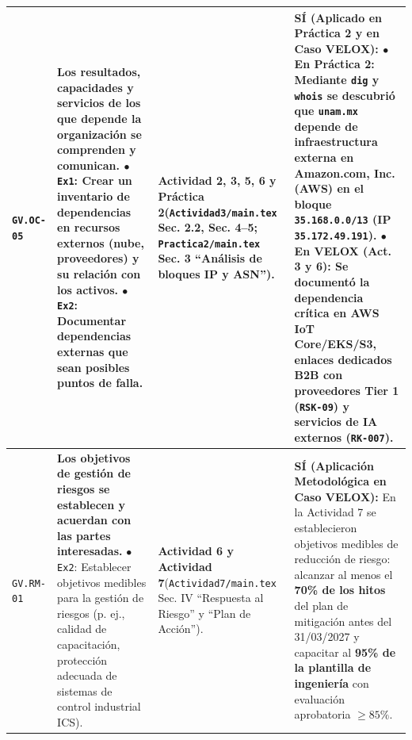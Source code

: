 \documentclass[letterpaper,11pt]{article}
\begin{document}
\begin{longtable}{|C{1.5cm}|L{5.3cm}|L{4.3cm}|L{5.8cm}|}
\texttt{GV.OC-05} &
\textbf{Los resultados, capacidades y servicios de los que depende la organización se comprenden y comunican.}\newline
$\bullet$ \texttt{Ex1}: Crear un inventario de dependencias en recursos externos (nube, proveedores) y su relación con los activos.\newline
$\bullet$ \texttt{Ex2}: Documentar dependencias externas que sean posibles puntos de falla. &
\textbf{Actividad 2, 3, 5, 6 y Práctica 2}\newline (\texttt{Actividad3/main.tex} Sec. 2.2, Sec. 4--5; \texttt{Practica2/main.tex} Sec. 3 ``Análisis de bloques IP y ASN''). &
\textbf{SÍ (Aplicado en Práctica 2 y en Caso VELOX):}\newline
$\bullet$ \textbf{En Práctica 2:} Mediante \texttt{dig} y \texttt{whois} se descubrió que \texttt{unam.mx} depende de infraestructura externa en \textbf{Amazon.com, Inc. (AWS)} en el bloque \texttt{35.168.0.0/13} (IP \texttt{35.172.49.191}).\newline
$\bullet$ \textbf{En VELOX (Act. 3 y 6):} Se documentó la dependencia crítica en AWS IoT Core/EKS/S3, enlaces dedicados B2B con proveedores Tier 1 (\texttt{RSK-09}) y servicios de IA externos (\texttt{RK-007}). \\
\hline

\texttt{GV.RM-01} &
\textbf{Los objetivos de gestión de riesgos se establecen y acuerdan con las partes interesadas.}\newline
$\bullet$ \texttt{Ex2}: Establecer objetivos medibles para la gestión de riesgos (p. ej., calidad de capacitación, protección adecuada de sistemas de control industrial ICS). &
\textbf{Actividad 6 y Actividad 7}\newline (\texttt{Actividad7/main.tex} Sec. IV ``Respuesta al Riesgo'' y ``Plan de Acción''). &
\textbf{SÍ (Aplicación Metodológica en Caso VELOX):}\newline
En la Actividad 7 se establecieron objetivos medibles de reducción de riesgo: alcanzar al menos el \textbf{70\% de los hitos} del plan de mitigación antes del 31/03/2027 y capacitar al \textbf{95\% de la plantilla de ingeniería} con evaluación aprobatoria $\ge 85\%$. \\
\hline


\end{longtable}
\end{document}
